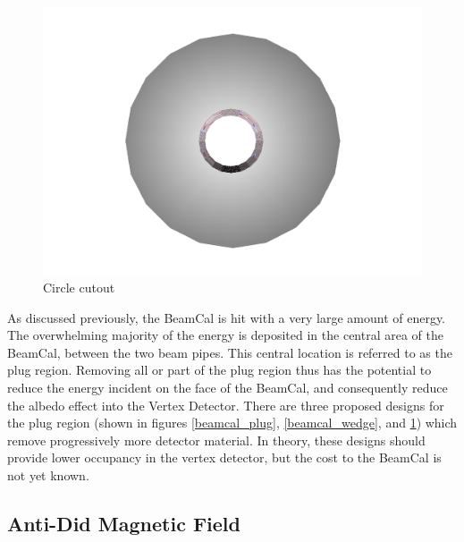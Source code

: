 \documentclass{report}
\begin{document}
\begin{figure}[h]
\begin{minipage}{0.3\textwidth}
                        \label{beamcal_wedge}
                    \end{minipage}
                    \begin{minipage}{0.3\textwidth}
                        \includegraphics[width=\textwidth]{beamcal_circle}
                        \caption{Circle cutout}
                        \label{beamcal_circle}
                    \end{minipage}
                \end{figure}

                As discussed previously, the BeamCal is hit with a very large amount of energy. The overwhelming majority of the energy is deposited in the central area of the BeamCal, between the two beam pipes. This central location is referred to as the plug region. Removing all or part of the plug region thus has the potential to reduce the energy incident on the face of the BeamCal, and consequently reduce the albedo effect into the Vertex Detector. There are three proposed designs for the plug region (shown in figures \ref{beamcal_plug}, \ref{beamcal_wedge}, and \ref{beamcal_circle}) which remove progressively more detector material. In theory, these designs should provide lower occupancy in the vertex detector, but the cost to the BeamCal is not yet known.


            \subsection{Anti-Did Magnetic Field}
\end{document}
